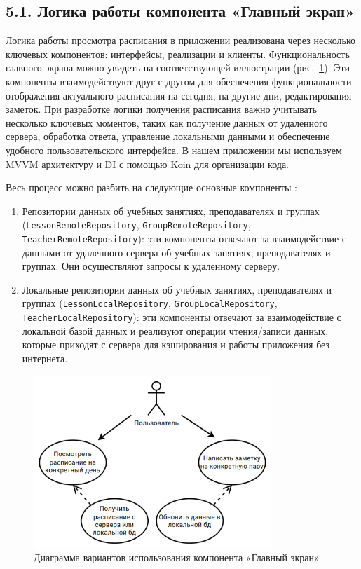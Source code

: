 \documentclass{vsureport}
\begin{document}
\subsection*{5.1. Логика работы компонента «Главный экран»}

Логика работы просмотра расписания в приложении реализована через несколько ключевых компонентов: интерфейсы, реализации и клиенты. Функциональность главного экрана можно увидеть на соответствующей иллюстрации (рис.~\ref{fig:fig11}).
Эти компоненты взаимодействуют друг с другом для обеспечения функциональности отображения актуального расписания на сегодня, на другие дни, редактирования заметок. При разработке логики получения расписания важно учитывать несколько ключевых моментов, таких как получение данных от удаленного сервера, обработка ответа, управление локальными данными и обеспечение удобного пользовательского интерфейса. В нашем приложении мы используем MVVM архитектуру и DI с помощью Koin для организации кода.

Весь процесс можно разбить на следующие основные компоненты \cite{ref10}: 
\begin{enumerate}
    \item Репозитории данных об учебных занятиях, преподавателях и группах (\texttt{LessonRemoteRepository}, \texttt{GroupRemoteRepository}, \\  \texttt{TeacherRemoteRepository}): эти компоненты отвечают за взаимодействие с данными от удаленного сервера об учебных занятиях, преподавателях и группах. Они осуществляют запросы к удаленному серверу. 
    \item Локальные репозитории данных об учебных занятиях, преподавателях и группах (\texttt{LessonLocalRepository}, \texttt{GroupLocalRepository}, \\  \texttt{TeacherLocalRepository}): эти компоненты отвечают за взаимодействие с локальной базой данных и реализуют операции чтения/записи данных, которые приходят с сервера для кэширования и работы приложения без интернета.
\end{enumerate}

\begin{figure}[H]
    \centering
    \includegraphics[width=0.8\textwidth]{11.png}
    \caption{Диаграмма вариантов использования компонента «Главный экран»}
    \label{fig:fig11}
\end{figure}
\end{document}
